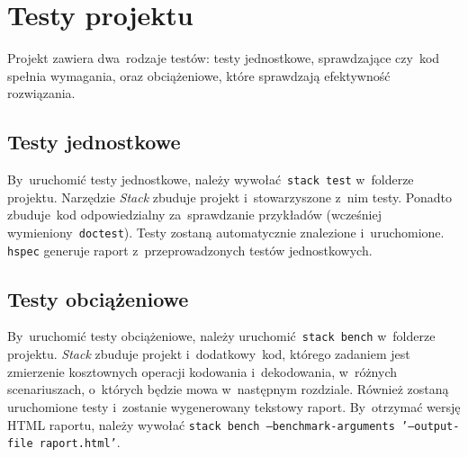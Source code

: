 \documentclass[../../praca.tex]{subfiles}
\begin{document}
\section{Testy projektu}

Projekt zawiera dwa~rodzaje testów: testy jednostkowe, sprawdzające
czy~kod spełnia wymagania, oraz obciążeniowe, które sprawdzają
efektywność rozwiązania.

\subsection{Testy jednostkowe}

By~uruchomić testy jednostkowe, należy wywołać~\texttt{stack test}
w~folderze projektu. Narzędzie \emph{Stack} zbuduje projekt
i~stowarzyszone z~nim testy. Ponadto zbuduje~kod
odpowiedzialny za~sprawdzanie przykładów (wcześniej
wymieniony~\texttt{doctest}). Testy zostaną automatycznie
znalezione i~uruchomione. \texttt{hspec} 
generuje raport z~przeprowadzonych testów jednostkowych.

\subsection{Testy obciążeniowe}

By~uruchomić testy obciążeniowe, należy uruchomić~\texttt{stack bench}
w~folderze projektu. \emph{Stack} zbuduje projekt
i~dodatkowy~kod, którego zadaniem jest zmierzenie
kosztownych operacji kodowania i~dekodowania,
w~różnych scenariuszach, o~których będzie mowa
w~następnym rozdziale. Również zostaną uruchomione
testy i~zostanie wygenerowany tekstowy raport. 
By~otrzymać wersję HTML raportu, należy wywołać
\texttt{stack bench --benchmark-arguments '--output-file raport.html'}.
\end{document}
